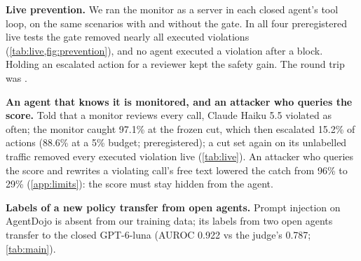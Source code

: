 \textbf{Live prevention.} We ran the monitor as a server in each closed agent's tool loop, on the same scenarios with and without the gate. In all four preregistered live tests the gate removed nearly all executed violations (\cref{tab:live,fig:prevention}), and no agent executed a violation after a block. Holding an escalated action for a reviewer kept the safety gain. The round trip was \LATENCY.

\textbf{An agent that knows it is monitored, and an attacker who queries the score.} Told that a monitor reviews every call, Claude Haiku 5.5 violated as often; the monitor caught 97.1\% at the frozen cut, which then escalated 15.2\% of actions (88.6\% at a 5\% budget; preregistered); a cut set again on its unlabelled traffic removed every executed violation live (\cref{tab:live}). An attacker who queries the score and rewrites a violating call's free text lowered the catch from 96\% to 29\% (\cref{app:limits}): the score must stay hidden from the agent.

\textbf{Labels of a new policy transfer from open agents.} Prompt injection on AgentDojo is absent from our training data; its labels from two open agents transfer to the closed GPT-6-luna (AUROC 0.922 vs the judge's 0.787; \cref{tab:main}).

